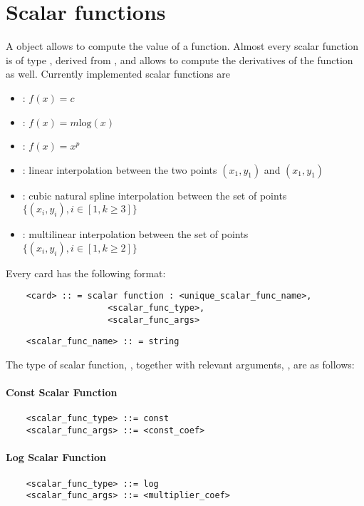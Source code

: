 \chapter{Scalar functions}\label{sec:SCALARFUNCS}
A  object allows to compute the value of a function.
Almost every scalar function is of type ,
derived from , and allows to compute the derivatives of
the function as well. Currently implemented scalar functions are
\begin{itemize}
\item {}: $f(x)=c$
\item {}: $f(x)=m\textrm{log}(x)$
\item {}: $f(x)=x^p$
\item {}: linear interpolation between the two points $(x_1,y_1)$
and $(x_1,y_1)$
\item {}: cubic natural spline interpolation between the 
set of points $\{(x_i,y_i), i\in[1,k\geq3]\}$
\item {}: multilinear interpolation between the 
set of points $\{(x_i,y_i), i\in[1,k\geq2]\}$
\end{itemize}

\noindent
Every  card has the following format:
\begin{verbatim}
    <card> :: = scalar function : <unique_scalar_func_name>, 
                    <scalar_func_type>,
                    <scalar_func_args>
\end{verbatim}
\begin{verbatim}
    <scalar_func_name> :: = string 
\end{verbatim}

\noindent
The type of scalar function,
, together 
with relevant arguments, ,
are as follows:
\subsubsection{Const Scalar Function}
\begin{verbatim}
    <scalar_func_type> ::= const
    <scalar_func_args> ::= <const_coef>
\end{verbatim}
\subsubsection{Log Scalar Function}
\begin{verbatim}
    <scalar_func_type> ::= log
    <scalar_func_args> ::= <multiplier_coef>
\end{verbatim}

